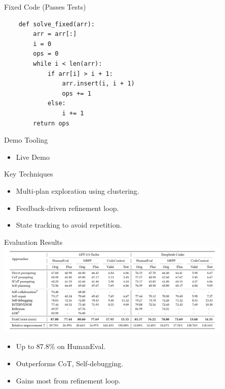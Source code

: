 \documentclass{beamer}
\begin{document}
	\begin{frame}[fragile]{Fixed Code (Passes Tests)}
	\scriptsize
	\begin{verbatim}
	def solve_fixed(arr):
	    arr = arr[:]
	    i = 0
	    ops = 0
	    while i < len(arr):
	        if arr[i] > i + 1:
	            arr.insert(i, i + 1)
	            ops += 1
	        else:
	            i += 1
	    return ops
	\end{verbatim}
	\end{frame}
	

	\begin{frame}{Demo Tooling}
	  \begin{itemize}
	    \item Live Demo
	  \end{itemize}
	\end{frame}



	\begin{frame}{Key Techniques}
	  \begin{itemize}
	    \item Multi-plan exploration using clustering.
	    \item Feedback-driven refinement loop.
	    \item State tracking to avoid repetition.
	  \end{itemize}
	\end{frame}
	
	\begin{frame}{Evaluation Results}
	  \includegraphics[width=0.85\textwidth]{paircoder-results.png}
	  \begin{itemize}
	    \item Up to 87.8\% on HumanEval.
	    \item Outperforms CoT, Self-debugging.
	    \item Gains most from refinement loop.
	  \end{itemize}
	\end{frame}
	
\end{document}
